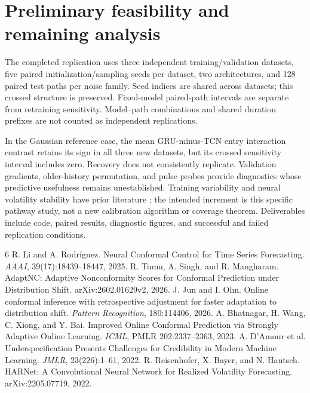 \documentclass{article}
\begin{document}
\section{Preliminary feasibility and remaining analysis}
The completed replication uses three independent training/validation datasets,
five paired initialization/sampling seeds per dataset, two architectures, and
128 paired test paths per noise family. Seed indices are shared across datasets;
this crossed structure is preserved. Fixed-model paired-path intervals are
separate from retraining sensitivity. Model--path combinations and shared
duration prefixes are not counted as independent replications.

In the Gaussian reference case, the mean GRU-minus-TCN entry interaction
contrast retains its sign in all three new datasets, but its crossed sensitivity
interval includes zero. Recovery does not consistently replicate.
Validation gradients, older-history permutation, and pulse probes provide
diagnostics whose predictive usefulness remains unestablished.
Training variability and neural volatility stability have prior literature
\citep{damour,harnet}; the intended increment is this specific pathway study,
not a new calibration algorithm or coverage theorem.
Deliverables include code, paired results, diagnostic figures, and successful
and failed replication conditions.

\begin{thebibliography}{6}
\small
{}
R. Li and A. Rodr\'{i}guez. Neural Conformal Control for Time Series Forecasting.
\emph{AAAI}, 39(17):18439--18447, 2025.
R. Tumu, A. Singh, and R. Mangharam. AdaptNC: Adaptive Nonconformity Scores
for Conformal Prediction under Distribution Shift. arXiv:2602.01629v2, 2026.
J. Jun and I. Ohn. Online conformal inference with retrospective adjustment
for faster adaptation to distribution shift. \emph{Pattern Recognition},
180:114406, 2026.
A. Bhatnagar, H. Wang, C. Xiong, and Y. Bai.
Improved Online Conformal Prediction via Strongly Adaptive Online Learning.
\emph{ICML}, PMLR 202:2337--2363, 2023.
A. D'Amour et al. Underspecification Presents Challenges for Credibility in
Modern Machine Learning. \emph{JMLR}, 23(226):1--61, 2022.
R. Reisenhofer, X. Bayer, and N. Hautsch.
HARNet: A Convolutional Neural Network for Realized Volatility Forecasting.
arXiv:2205.07719, 2022.
\end{thebibliography}
\end{document}
